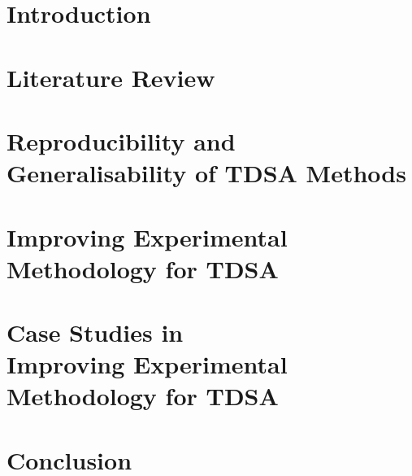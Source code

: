 \documentclass[twoside,11pt, a4paper]{report}
\begin{document}
\tableofcontents

\clearpage

\listoffigures

\clearpage

\listoftables

\clearpage
\pagestyle{main}




\FloatBarrier
\chapter{Introduction}
\label{chapter:introduction}


\FloatBarrier
\chapter{Literature Review}
\label{chapter:lit_review}


\FloatBarrier
\chapter{Reproducibility and Generalisability of TDSA Methods}
\label{chapter:reproducibility}


\FloatBarrier
\chapter[Improving Experimental Methodology for TDSA]{Improving Experimental\\Methodology for TDSA}
\label{chapter:methodology}


\FloatBarrier
\chapter[Case Studies in Improving Experimental Methodology for TDSA]{Case Studies in\\Improving Experimental\\Methodology for TDSA}
\label{chapter:case_study_methodology}


\FloatBarrier
\chapter{Conclusion}
\label{chapter:conclusion}

\end{document}
